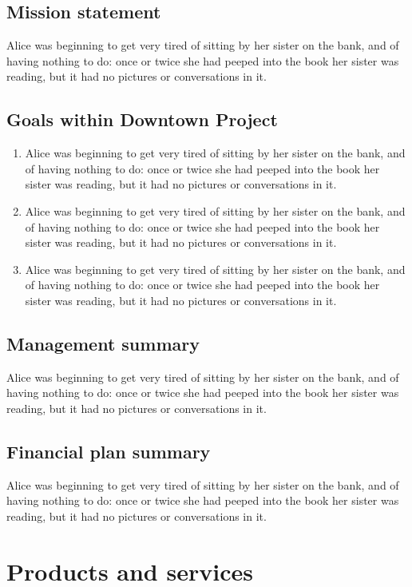 \documentclass[12pt]{article}
\begin{document}
\subsection{Mission statement}
\label{sec-1-2}
Alice was beginning to get very tired of sitting by her sister on the bank, and of having nothing to do: once or twice she had peeped into the book her sister was reading, but it had no pictures or conversations in it. 

\subsection{Goals within Downtown Project}
\label{sec-1-3}
\begin{enumerate}
\item Alice was beginning to get very tired of sitting by her sister on the bank, and of having nothing to do: once or twice she had peeped into the book her sister was reading, but it had no pictures or conversations in it.
\item Alice was beginning to get very tired of sitting by her sister on the bank, and of having nothing to do: once or twice she had peeped into the book her sister was reading, but it had no pictures or conversations in it.
\item Alice was beginning to get very tired of sitting by her sister on the bank, and of having nothing to do: once or twice she had peeped into the book her sister was reading, but it had no pictures or conversations in it.
\end{enumerate}

\subsection{Management summary}
\label{sec-1-4}
Alice was beginning to get very tired of sitting by her sister on the bank, and of having nothing to do: once or twice she had peeped into the book her sister was reading, but it had no pictures or conversations in it. 

\subsection{Financial plan summary}
\label{sec-1-5}
Alice was beginning to get very tired of sitting by her sister on the bank, and of having nothing to do: once or twice she had peeped into the book her sister was reading, but it had no pictures or conversations in it. 

\section{Products and services}
\label{sec-2}
\end{document}
